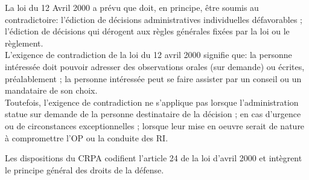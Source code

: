 \documentclass[10pt, a4paper, openany]{book}
\begin{document}
La loi du 12 Avril 2000 a prévu que doit, en principe, être soumis au contradictoire: l'édiction de décisions administratives individuelles défavorables ; l'édiction de décisions qui dérogent aux règles générales fixées par la loi ou le règlement. \\
L'exigence de contradiction de la loi du 12 avril 2000 signifie que: la personne intéressée doit pouvoir adresser des observations orales (sur demande) ou écrites, préalablement ; la personne intéressée peut se faire assister par un conseil ou un mandataire de son choix. \\
Toutefois, l'exigence de contradiction ne s'applique pas lorsque l'administration statue sur demande de la personne destinataire de la décision ; en cas d'urgence ou de circonstances exceptionnelles ; lorsque leur mise en oeuvre serait de nature à compromettre l'OP ou la conduite des RI. 


Les dispositions du CRPA codifient l'article 24 de la loi d'avril 2000 et intègrent le principe général des droits de la défense. 
\end{document}
